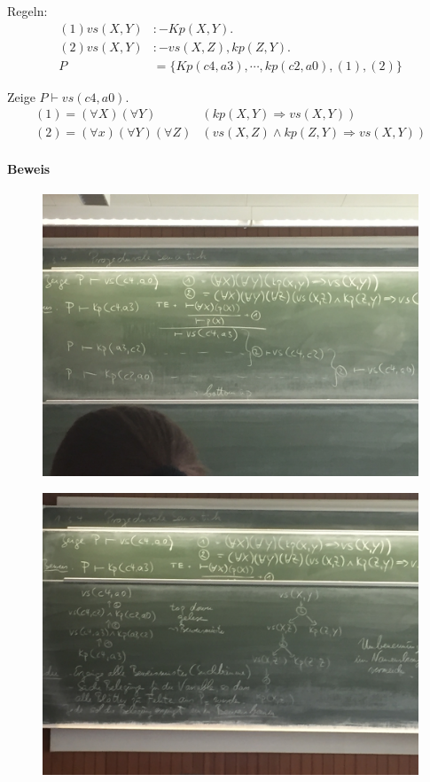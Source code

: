 \documentclass[12pt, a4paper]{article}
\begin{document}
Regeln: 
\begin{equation}
\begin{split}
(1) vs(X, Y) &:- Kp(X, Y). \\
(2) vs(X, Y) &:- vs(X, Z), kp(Z, Y). \\
P &= \{ Kp (c4, a3), \cdots, kp(c2, a0), (1), (2) \} 
\end{split}
\end{equation}

Zeige $P \vdash vs(c4, a0)$. 
\begin{equation}
\begin{split}
(1) = (\forall X)(\forall Y)&(kp(X, Y) \Rightarrow vs(X, Y)) \\
(2) = (\forall x)(\forall Y)(\forall Z)&(vs(X, Z) \wedge kp(Z , Y) \Rightarrow vs(X, Y))
\end{split}
\end{equation}

\paragraph{Beweis}
\begin{figure}[h!]
\centering
\includegraphics[width=0.7\linewidth]{img/img4}
\caption{}
\label{fig:img4}
\end{figure}
\begin{figure}[h!]
\centering
\includegraphics[width=0.7\linewidth]{img/img5}
\caption{}
\label{fig:img5}
\end{figure}
\end{document}
